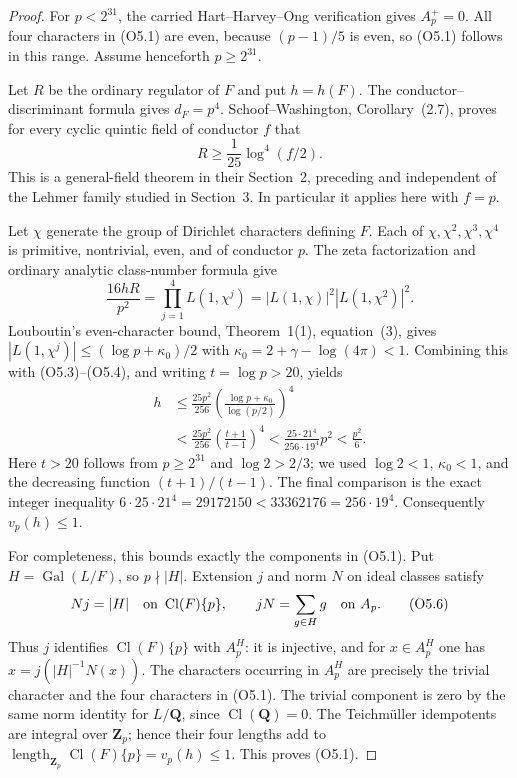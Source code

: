 \documentclass[11pt,a4paper]{article}
\theoremstyle{definition}
\begin{document}
\begin{proof}
For $p<2^{31}$, the carried Hart--Harvey--Ong verification gives
$A_p^+=0$.  All four characters in (O5.1) are even, because
$(p-1)/5$ is even, so (O5.1) follows in this range.
Assume henceforth $p\ge2^{31}$.

Let $R$ be the ordinary regulator of $F$ and put $h=h(F)$.
The conductor--discriminant formula gives $d_F=p^4$.
Schoof--Washington, Corollary~(2.7), proves for every cyclic
quintic field of conductor $f$ that
\[
                        R\ge\frac1{25}\log^4(f/2).
                                                        \tag{O5.3}
\]
This is a general-field theorem in their Section~2, preceding
and independent of the Lehmer family studied in Section~3.
In particular it applies here with $f=p$.

Let $\chi$ generate the group of Dirichlet characters defining $F$.
Each of $\chi,\chi^2,\chi^3,\chi^4$ is primitive, nontrivial,
even, and of conductor $p$.  The zeta factorization and ordinary
analytic class-number formula give
\[
       \frac{16hR}{p^2}
         =\prod_{j=1}^4 L(1,\chi^j)
         =|L(1,\chi)|^2|L(1,\chi^2)|^2.         \tag{O5.4}
\]
Louboutin's even-character bound, Theorem~1(1), equation~(3), gives
$|L(1,\chi^j)|\le(\log p+\kappa_0)/2$ with
$\kappa_0=2+\gamma-\log(4\pi)<1$.
Combining this with (O5.3)--(O5.4), and writing $t=\log p>20$, yields
\[
 \begin{aligned}
 h&\le\frac{25p^2}{256}
       \left(\frac{\log p+\kappa_0}{\log(p/2)}\right)^4\\
  &<\frac{25p^2}{256}
       \left(\frac{t+1}{t-1}\right)^4
   <\frac{25\cdot21^4}{256\cdot19^4}p^2
   <\frac{p^2}{6}.
 \end{aligned}                                            \tag{O5.5}
\]
Here $t>20$ follows from $p\ge2^{31}$ and $\log2>2/3$;
we used $\log2<1$, $\kappa_0<1$, and the decreasing function
$(t+1)/(t-1)$.  The final comparison is the exact integer inequality
$6\cdot25\cdot21^4=29172150<33362176=256\cdot19^4$.
Consequently $v_p(h)\le1$.

For completeness, this bounds exactly the components in (O5.1).
Put $H=\operatorname{Gal}(L/F)$, so $p\nmid |H|$.
Extension $j$ and norm $N$ on ideal classes satisfy
\[
 Nj=|H|\quad\hbox{on }\operatorname{Cl}(F)\{p\},
 \qquad
 jN=\sum_{g\in H}g\quad\hbox{on }A_p.
                                                        \tag{O5.6}
\]
Thus $j$ identifies $\operatorname{Cl}(F)\{p\}$ with $A_p^H$:
it is injective, and for $x\in A_p^H$ one has
$x=j(|H|^{-1}N(x))$.
The characters occurring in $A_p^H$ are precisely the trivial
character and the four characters in (O5.1).
The trivial component is zero by the same norm identity for
$L/\mathbf Q$, since $\operatorname{Cl}(\mathbf Q)=0$.
The Teichm\"uller idempotents are integral over $\mathbf Z_p$;
hence their four lengths add to
$\operatorname{length}_{\mathbf Z_p}\operatorname{Cl}(F)\{p\}
=v_p(h)\le1$.  This proves (O5.1).
\end{proof}
\end{document}
